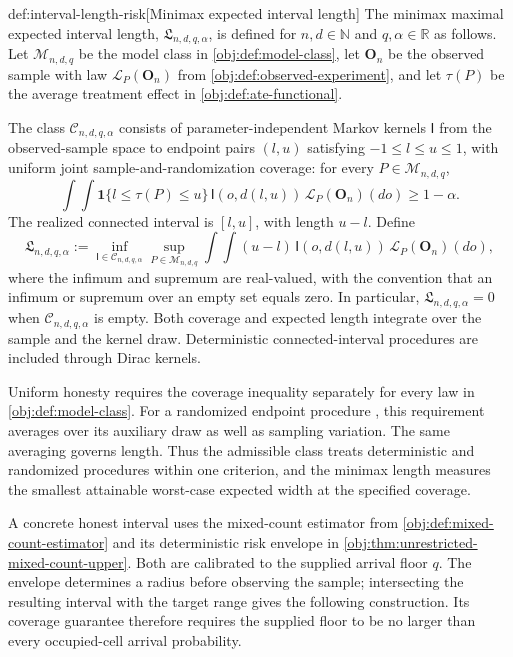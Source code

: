 \documentclass[11pt]{article}
\begin{document}
\begin{definitionv}{def:interval-length-risk}[Minimax expected interval length]
The minimax maximal expected interval length, \(\mathfrak L_{n,d,q,\alpha}\), is defined for \(n,d\in\mathbb N\) and \(q,\alpha\in\mathbb R\) as follows. Let \(\mathcal M_{n,d,q}\) be the model class in \cref{obj:def:model-class}, let \(\mathbf O_n\) be the observed sample with law \(\mathcal L_P(\mathbf O_n)\) from \cref{obj:def:observed-experiment}, and let \(\tau(P)\) be the average treatment effect in \cref{obj:def:ate-functional}.

The class \(\mathcal C_{n,d,q,\alpha}\) consists of parameter-independent Markov kernels \(\mathsf I\) from the observed-sample space to endpoint pairs \((l,u)\) satisfying \(-1\le l\le u\le1\), with uniform joint sample-and-randomization coverage: for every \(P\in\mathcal M_{n,d,q}\),
\[
\int\!\int
\mathbf1\{l\le\tau(P)\le u\}\,
\mathsf I(o,d(l,u))\,
\mathcal L_P(\mathbf O_n)(do)
\ge 1-\alpha.
\]
The realized connected interval is \([l,u]\), with length \(u-l\). Define
\[
\mathfrak L_{n,d,q,\alpha}
:=
\inf_{\mathsf I\in\mathcal C_{n,d,q,\alpha}}
\sup_{P\in\mathcal M_{n,d,q}}
\int\!\int (u-l)\,
\mathsf I(o,d(l,u))\,
\mathcal L_P(\mathbf O_n)(do),
\]
where the infimum and supremum are real-valued, with the convention that an infimum or supremum over an empty set equals zero. In particular, \(\mathfrak L_{n,d,q,\alpha}=0\) when \(\mathcal C_{n,d,q,\alpha}\) is empty. Both coverage and expected length integrate over the sample and the kernel draw. Deterministic connected-interval procedures are included through Dirac kernels.
\end{definitionv}

Uniform honesty requires the coverage inequality separately for every law in \cref{obj:def:model-class}. For a randomized endpoint procedure , this requirement averages over its auxiliary draw as well as sampling variation. The same averaging governs length. Thus the admissible class  treats deterministic and randomized procedures within one criterion, and the minimax length  measures the smallest attainable worst-case expected width at the specified coverage.

A concrete honest interval uses the mixed-count estimator  from \cref{obj:def:mixed-count-estimator} and its deterministic risk envelope  in \cref{obj:thm:unrestricted-mixed-count-upper}. Both are calibrated to the supplied arrival floor \(q\). The envelope determines a radius before observing the sample; intersecting the resulting interval with the target range gives the following construction. Its coverage guarantee therefore requires the supplied floor to be no larger than every occupied-cell arrival probability.
\end{document}
